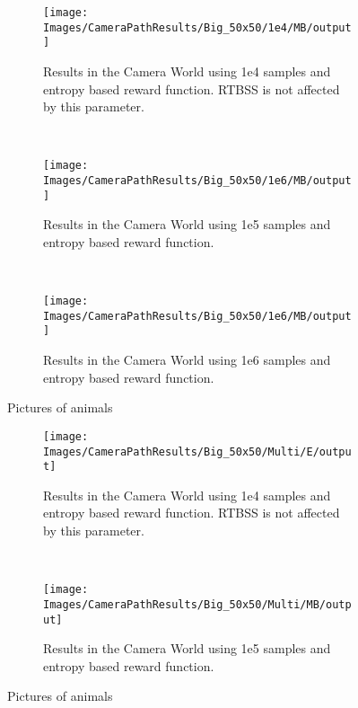 \begin{figure}[h]
        \centering
        \begin{subfigure}[t]{0.3\textwidth}
                \texttt{[image: Images/CameraPathResults/Big\_50x50/1e4/MB/output]}
                \caption{Results in the Camera World using 1e4 samples and entropy based reward
                function. RTBSS is not affected by this parameter.}
                \label{fig:m4e}
        \end{subfigure}%
        ~ %
        \begin{subfigure}[t]{0.3\textwidth}
                \texttt{[image: Images/CameraPathResults/Big\_50x50/1e6/MB/output]}
                \caption{Results in the Camera World using 1e5 samples and entropy based reward
                function.}
                \label{fig:m5e}
        \end{subfigure}
        ~ %
        \begin{subfigure}[t]{0.3\textwidth}
                \texttt{[image: Images/CameraPathResults/Big\_50x50/1e6/MB/output]}
                \caption{Results in the Camera World using 1e6 samples and entropy based reward
                function.}
                \label{fig:m6e}
        \end{subfigure}
        \caption{Pictures of animals}\label{fig:me}
\end{figure}

\begin{figure}[h]
        \centering
        \begin{subfigure}[t]{0.5\textwidth}
                \texttt{[image: Images/CameraPathResults/Big\_50x50/Multi/E/output]}
                \caption{Results in the Camera World using 1e4 samples and entropy based reward
                function. RTBSS is not affected by this parameter.}
                \label{fig:m4e}
        \end{subfigure}%
        ~ %
        \begin{subfigure}[t]{0.5\textwidth}
                \texttt{[image: Images/CameraPathResults/Big\_50x50/Multi/MB/output]}
                \caption{Results in the Camera World using 1e5 samples and entropy based reward
                function.}
                \label{fig:m5e}
        \end{subfigure}
        \caption{Pictures of animals}\label{fig:me}
\end{figure}
